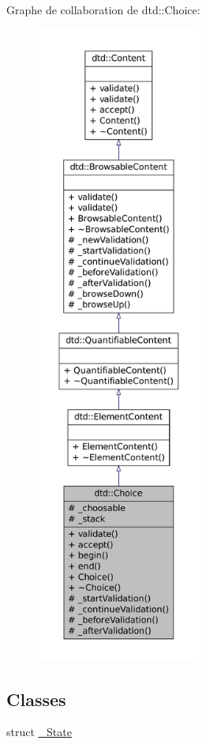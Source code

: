 Graphe de collaboration de dtd::Choice:\nopagebreak
\begin{figure}[H]
\begin{center}
\leavevmode
\includegraphics[height=600pt]{classdtd_1_1_choice__coll__graph}
\end{center}
\end{figure}
\subsection*{Classes}
\begin{DoxyCompactItemize}
\item 
struct \hyperlink{structdtd_1_1_choice_1_1___state}{\_\-State}
\end{DoxyCompactItemize}
